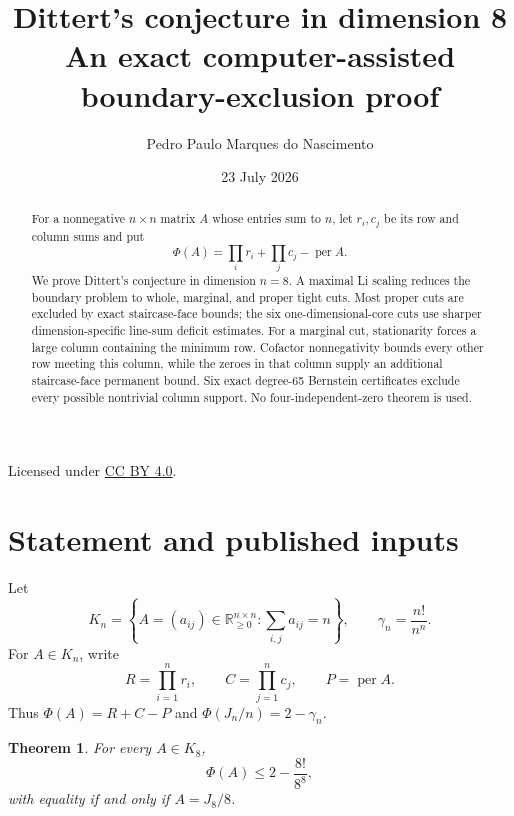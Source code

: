 \documentclass[11pt]{article}
\title{Dittert's conjecture in dimension 8\\
\large An exact computer-assisted boundary-exclusion proof}
\author{Pedro Paulo Marques do Nascimento}
\date{23 July 2026}
\newtheorem{theorem}{Theorem}[section]
\theoremstyle{remark}
\newcommand{\per}{\operatorname{per}}
\newcommand{\RR}{\mathbb R}
\begin{document}
\maketitle

\begin{center}

\small Licensed under \href{https://creativecommons.org/licenses/by/4.0/}{CC BY 4.0}.
\end{center}

\begin{abstract}
For a nonnegative $n\times n$ matrix $A$ whose entries sum to $n$, let $r_i,c_j$
be its row and column sums and put
\[
 \Phi(A)=\prod_i r_i+\prod_j c_j-\per A.
\]
We prove Dittert's conjecture in dimension $n=8$.  A maximal Li scaling
reduces the boundary problem to whole, marginal, and proper tight cuts.
Most proper cuts are excluded by exact staircase-face bounds; the six
one-dimensional-core cuts use sharper dimension-specific line-sum deficit
estimates.  For a marginal cut, stationarity forces a large column containing
the minimum row.  Cofactor nonnegativity bounds every other row meeting this
column, while the zeroes in that column supply an additional staircase-face
permanent bound.  Six exact degree-65 Bernstein certificates exclude every
possible nontrivial column support.  No four-independent-zero theorem is used.
\end{abstract}

\section{Statement and published inputs}

Let
\[
 K_n=\left\{A=(a_{ij})\in\RR_{\ge0}^{n\times n}:
       \sum_{i,j}a_{ij}=n\right\},
 \qquad
 \gamma_n=\frac{n!}{n^n}.
\]
For $A\in K_n$, write
\[
 R=\prod_{i=1}^n r_i,\qquad
 C=\prod_{j=1}^n c_j,\qquad
 P=\per A.
\]
Thus $\Phi(A)=R+C-P$ and $\Phi(J_n/n)=2-\gamma_n$.

\begin{theorem}\label{thm:main}
For every $A\in K_8$,
\[
 \Phi(A)\le 2-\frac{8!}{8^8},
\]
with equality if and only if $A=J_8/8$.
\end{theorem}
\end{document}
